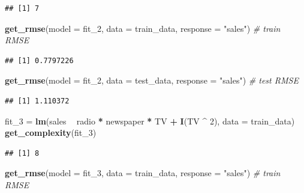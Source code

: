 \documentclass[]{report}
\newenvironment{Shaded}{\begin{snugshade}}{\end{snugshade}}
\newcommand{\KeywordTok}[1]{\textcolor[rgb]{0.13,0.29,0.53}{\textbf{#1}}}
\newcommand{\DataTypeTok}[1]{\textcolor[rgb]{0.13,0.29,0.53}{#1}}
\newcommand{\DecValTok}[1]{\textcolor[rgb]{0.00,0.00,0.81}{#1}}
\newcommand{\StringTok}[1]{\textcolor[rgb]{0.31,0.60,0.02}{#1}}
\newcommand{\CommentTok}[1]{\textcolor[rgb]{0.56,0.35,0.01}{\textit{#1}}}
\newcommand{\OperatorTok}[1]{\textcolor[rgb]{0.81,0.36,0.00}{\textbf{#1}}}
\newcommand{\NormalTok}[1]{#1}
\begin{document}
\begin{verbatim}
## [1] 7
\end{verbatim}

\begin{Shaded}
\begin{Highlighting}[]
\KeywordTok{get_rmse}\NormalTok{(}\DataTypeTok{model =}\NormalTok{ fit_}\DecValTok{2}\NormalTok{, }\DataTypeTok{data =}\NormalTok{ train_data, }\DataTypeTok{response =} \StringTok{"sales"}\NormalTok{) }\CommentTok{# train RMSE}
\end{Highlighting}
\end{Shaded}

\begin{verbatim}
## [1] 0.7797226
\end{verbatim}

\begin{Shaded}
\begin{Highlighting}[]
\KeywordTok{get_rmse}\NormalTok{(}\DataTypeTok{model =}\NormalTok{ fit_}\DecValTok{2}\NormalTok{, }\DataTypeTok{data =}\NormalTok{ test_data, }\DataTypeTok{response =} \StringTok{"sales"}\NormalTok{) }\CommentTok{# test RMSE}
\end{Highlighting}
\end{Shaded}

\begin{verbatim}
## [1] 1.110372
\end{verbatim}

\begin{Shaded}
\begin{Highlighting}[]
\NormalTok{fit_}\DecValTok{3}\NormalTok{ =}\StringTok{ }\KeywordTok{lm}\NormalTok{(sales }\OperatorTok{~}\StringTok{ }\NormalTok{radio }\OperatorTok{*}\StringTok{ }\NormalTok{newspaper }\OperatorTok{*}\StringTok{ }\NormalTok{TV }\OperatorTok{+}\StringTok{ }\KeywordTok{I}\NormalTok{(TV }\OperatorTok{^}\StringTok{ }\DecValTok{2}\NormalTok{), }\DataTypeTok{data =}\NormalTok{ train_data)}
\KeywordTok{get_complexity}\NormalTok{(fit_}\DecValTok{3}\NormalTok{)}
\end{Highlighting}
\end{Shaded}

\begin{verbatim}
## [1] 8
\end{verbatim}

\begin{Shaded}
\begin{Highlighting}[]
\KeywordTok{get_rmse}\NormalTok{(}\DataTypeTok{model =}\NormalTok{ fit_}\DecValTok{3}\NormalTok{, }\DataTypeTok{data =}\NormalTok{ train_data, }\DataTypeTok{response =} \StringTok{"sales"}\NormalTok{) }\CommentTok{# train RMSE}
\end{Highlighting}
\end{Shaded}
\end{document}

